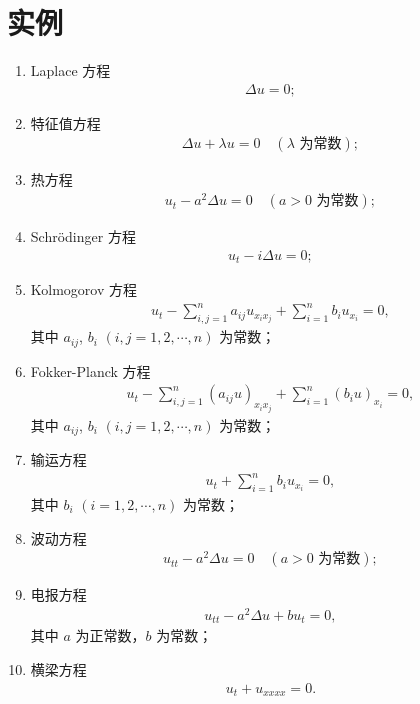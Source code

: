 \documentclass[../../main.tex]{subfiles}%
\begin{document}
\section{实例}

\begin{examples}[较著名的一些线性偏微分方程]
\begin{enumerate}[(1)]
\item Laplace 方程
\begin{align*}
\Delta u = 0;
\end{align*}

\item 特征值方程
\begin{align*}
\Delta u + \lambda u = 0 \quad (\lambda \text{ 为常数});
\end{align*}

\item 热方程
\begin{align*}
u_t - a^2 \Delta u = 0 \quad (a > 0 \text{ 为常数});
\end{align*}

\item Schr\"{o}dinger 方程
\begin{align*}
u_t - i \Delta u = 0;
\end{align*}

\item Kolmogorov 方程
\begin{align*}
u_t - \sum_{i,j=1}^{n} a_{ij} u_{x_i x_j} + \sum_{i=1}^{n} b_i u_{x_i} = 0,
\end{align*}
其中 $a_{ij}$, $b_i$ $(i,j=1,2,\cdots,n)$ 为常数；

\item Fokker-Planck 方程
\begin{align*}
u_t - \sum_{i,j=1}^{n} (a_{ij} u)_{x_i x_j} + \sum_{i=1}^{n} (b_i u)_{x_i} = 0,
\end{align*}
其中 $a_{ij}$, $b_i$ $(i,j=1,2,\cdots,n)$ 为常数；

\item 输运方程
\begin{align*}
u_t + \sum_{i=1}^{n} b_i u_{x_i} = 0,
\end{align*}
其中 $b_i$ $(i=1,2,\cdots,n)$ 为常数；

\item 波动方程
\begin{align*}
u_{tt} - a^2 \Delta u = 0 \quad (a > 0 \text{ 为常数});
\end{align*}

\item 电报方程
\begin{align*}
u_{tt} - a^2 \Delta u + b u_t = 0,
\end{align*}
其中 $a$ 为正常数，$b$ 为常数；

\item 横梁方程
\begin{align*}
u_t + u_{xxxx} = 0.
\end{align*}
\end{enumerate}
\end{examples}
\end{document}
